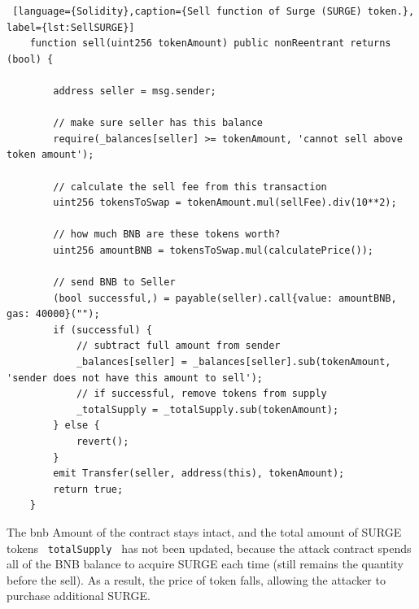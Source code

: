\begin{lstlisting} [language={Solidity},caption={Sell function of Surge (SURGE) token.}, label={lst:SellSURGE}]
    function sell(uint256 tokenAmount) public nonReentrant returns (bool) {
        
        address seller = msg.sender;
        
        // make sure seller has this balance
        require(_balances[seller] >= tokenAmount, 'cannot sell above token amount');
        
        // calculate the sell fee from this transaction
        uint256 tokensToSwap = tokenAmount.mul(sellFee).div(10**2);
        
        // how much BNB are these tokens worth?
        uint256 amountBNB = tokensToSwap.mul(calculatePrice());
        
        // send BNB to Seller
        (bool successful,) = payable(seller).call{value: amountBNB, gas: 40000}(""); 
        if (successful) {
            // subtract full amount from sender
            _balances[seller] = _balances[seller].sub(tokenAmount, 'sender does not have this amount to sell');
            // if successful, remove tokens from supply
            _totalSupply = _totalSupply.sub(tokenAmount);
        } else {
            revert();
        }
        emit Transfer(seller, address(this), tokenAmount);
        return true;
    }
\end{lstlisting}


The bnb Amount of the contract stays intact, and the total amount of SURGE tokens \texttt{ totalSupply }  
has not been updated, because the attack contract spends all of the BNB balance to acquire SURGE
 each time (still remains the quantity before the sell).
As a result, the price of token falls, allowing the attacker to purchase additional SURGE. 


